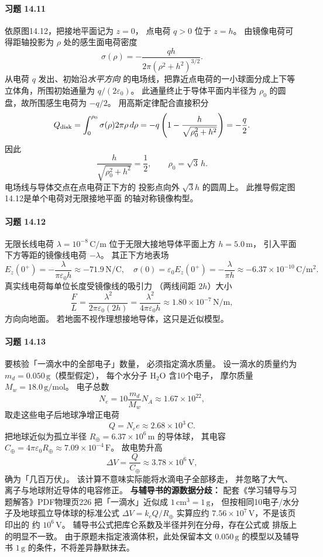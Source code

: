 \paragraph{习题 14.11}
依原图14.12，把接地平面记为 \(z=0\)，
点电荷 \(q>0\) 位于 \(z=h\)。
由镜像电荷可得距轴投影为 \(\rho\)
处的感生面电荷密度
\[
 \sigma(\rho)=-\frac{qh}
 {2\pi(\rho^2+h^2)^{3/2}}.
\]
从电荷 \(q\) 发出、初始沿\emph{水平方向}
的电场线，把靠近点电荷的一小球面分成上下等
立体角，所围初始通量为 \(q/(2\varepsilon_0)\)。
此通量终止于导体平面内半径为
\(\rho_0\) 的圆盘，故所围感生电荷为
\(-q/2\)。
用高斯定律配合直接积分
\[
 Q_{\rm disk}=\int_0^{\rho_0}
 \sigma(\rho)2\pi\rho\,d\rho
 =-q\left(1-\frac h{\sqrt{\rho_0^2+h^2}}\right)
 =-\frac q2.
\]
因此
\[
 \frac h{\sqrt{\rho_0^2+h^2}}=\frac12,\qquad
 \boxed{\rho_0=\sqrt3\,h}.
\]
电场线与导体交点在点电荷正下方的
投影点向外 \(\sqrt3h\) 的圆周上。
此推导假定图14.12是单个电荷对无限接地平面
的轴对称镜像构型。

\paragraph{习题 14.12}
无限长线电荷 \(\lambda=10^{-8}\,\mathrm{C/m}\)
位于无限大接地导体平面上方
\(h=5.0\,\mathrm m\)，
引入平面下方等距的镜像线电荷
\(-\lambda\)。
其正下方地表场
\[
 \boxed{E_z(0^+)=-\frac{\lambda}{\pi\varepsilon_0h}
 \approx-71.9\,\mathrm{N/C}},
\quad
 \boxed{\sigma(0)=\varepsilon_0E_z(0^+)
 =-\frac{\lambda}{\pi h}
 \approx-6.37\times10^{-10}\,\mathrm{C/m^2}}.
\]
真实线电荷每单位长度受镜像线的吸引力
（两线间距 \(2h\)）大小
\[
 \boxed{\frac FL=
 \frac{\lambda^2}{2\pi\varepsilon_0(2h)}
 =\frac{\lambda^2}{4\pi\varepsilon_0h}
 \approx1.80\times10^{-7}\,\mathrm{N/m}},
\]
方向向地面。
若地面不视作理想接地导体，这只是近似模型。

\paragraph{习题 14.13}
要核验「一滴水中的全部电子」数量，
必须指定滴水质量。
设一滴水的质量约为
\(m_d=0.050\,\mathrm g\)（模型假定），
每个水分子 \(\mathrm{H_2O}\) 含10个电子，
摩尔质量 \(M_w=18.0\,\mathrm{g/mol}\)。
电子总数
\[
 N_e=10\frac{m_d}{M_w}N_A
 \approx1.67\times10^{22},
\]
取走这些电子后地球净增正电荷
\[
 Q=N_ee\approx2.68\times10^3\,\mathrm C.
\]
把地球近似为孤立半径
\(R_\oplus=6.37\times10^6\,\mathrm m\) 的导体球，
其电容
\(C_\oplus=4\pi\varepsilon_0R_\oplus
 \approx7.09\times10^{-4}\,\mathrm F\)。
故电势升高
\[
 \boxed{\Delta V=\frac Q{C_\oplus}
 \approx3.78\times10^6\,\mathrm V},
\]
确为「几百万伏」。
该计算不意味实际能将水滴电子全部移走，
并忽略了大气、离子与地球附近导体的电容修正。
\textbf{与辅导书的源数据分歧：}
配套《学习辅导与习题解答》PDF物理页226
把「一滴水」近似成 \(1\,\mathrm{cm^3}=1\,\mathrm g\)，
但按相同10电子/水分子及地球孤立导体球的标准公式
\(\Delta V=k_eQ/R_\oplus\) 实算应约
\(7.56\times10^7\,\mathrm V\)，不是该页印出的
约 \(10^6\,\mathrm V\)。
辅导书公式把库仑系数及半径并列在分母，存在公式或
排版上的明显不一致。
由于原题未指定液滴体积，此处保留本文
\(0.050\,\mathrm g\) 的模型以及辅导书
\(1\,\mathrm g\) 的条件，不将差异静默抹去。

